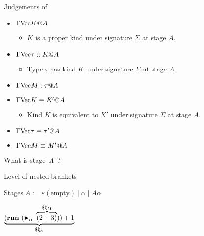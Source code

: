 \documentclass[dvipdfmx,aspectratio=169, 20pt]{beamer}
\begin{document}
\begin{frame}[fragile]{Judgements of \LMD}
    \begin{itemize}
        \item \( \Gamma \text{Vec} K @ A \)
            \begin{itemize}
                \item \( K \) is a proper kind under signature \( \Sigma \) at stage \( A \).
            \end{itemize}
        \item \( \Gamma \text{Vec} \tau :: K @ A \)
            \begin{itemize}
                \item Type \( \tau \) has kind \( K \) under signature \( \Sigma \) at stage \( A \).
            \end{itemize}
        \item \( \Gamma \text{Vec} M : \tau @ A \)
        \item \( \Gamma \text{Vec} K \equiv K' @ A \)
            \begin{itemize}
                \item Kind \( K \) is equivalent to \( K' \) under signature \( \Sigma \) at stage \( A \).
            \end{itemize}
        \item \( \Gamma \text{Vec} \tau \equiv \tau' @ A \)
        \item \( \Gamma \text{Vec} M \equiv M' @ A \)
    \end{itemize}
    \note{
    }
\end{frame}

\begin{frame}[fragile]{What is stage\ \( A \)\ ?}
    \newcommand{\underwrite}[3][]{
        \genfrac{}{}{#1}{}{\textstyle #2}{\textstyle #3}
    }

    Level of nested brankets
    \begin{block}{Stages}
        \( A := \varepsilon (\text{empty}) \mid \alpha \mid A\alpha \)
    \end{block}
    \begin{center}
        \( \underbrace{(\textbf{run}\ (\TB_\alpha\ \overbrace{(2 + 3)}^{\let\scriptstyle\textstyle\substack{@\alpha}})) + 1}_{\let\scriptstyle\textstyle\substack{@\varepsilon}} \)
    \end{center}
\end{frame}
\end{document}
